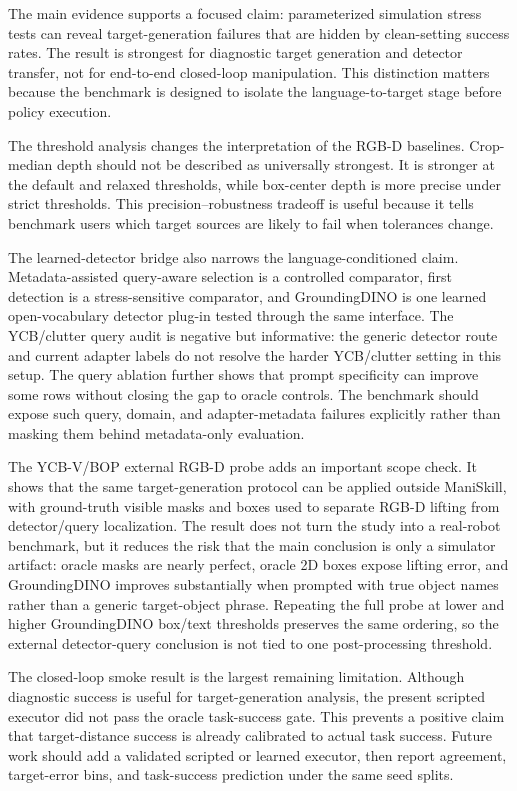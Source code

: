 The main evidence supports a focused claim: parameterized simulation stress tests can reveal target-generation failures that are hidden by clean-setting success rates. The result is strongest for diagnostic target generation and detector transfer, not for end-to-end closed-loop manipulation. This distinction matters because the benchmark is designed to isolate the language-to-target stage before policy execution.

The threshold analysis changes the interpretation of the RGB-D baselines. Crop-median depth should not be described as universally strongest. It is stronger at the default and relaxed thresholds, while box-center depth is more precise under strict thresholds. This precision--robustness tradeoff is useful because it tells benchmark users which target sources are likely to fail when tolerances change.

The learned-detector bridge also narrows the language-conditioned claim. Metadata-assisted query-aware selection is a controlled comparator, first detection is a stress-sensitive comparator, and GroundingDINO is one learned open-vocabulary detector plug-in tested through the same interface. The YCB/clutter query audit is negative but informative: the generic detector route and current adapter labels do not resolve the harder YCB/clutter setting in this setup. The query ablation further shows that prompt specificity can improve some rows without closing the gap to oracle controls. The benchmark should expose such query, domain, and adapter-metadata failures explicitly rather than masking them behind metadata-only evaluation.

The YCB-V/BOP external RGB-D probe adds an important scope check. It shows that the same target-generation protocol can be applied outside ManiSkill, with ground-truth visible masks and boxes used to separate RGB-D lifting from detector/query localization. The result does not turn the study into a real-robot benchmark, but it reduces the risk that the main conclusion is only a simulator artifact: oracle masks are nearly perfect, oracle 2D boxes expose lifting error, and GroundingDINO improves substantially when prompted with true object names rather than a generic target-object phrase. Repeating the full probe at lower and higher GroundingDINO box/text thresholds preserves the same ordering, so the external detector-query conclusion is not tied to one post-processing threshold.

The closed-loop smoke result is the largest remaining limitation. Although diagnostic success is useful for target-generation analysis, the present scripted executor did not pass the oracle task-success gate. This prevents a positive claim that target-distance success is already calibrated to actual task success. Future work should add a validated scripted or learned executor, then report agreement, target-error bins, and task-success prediction under the same seed splits.

